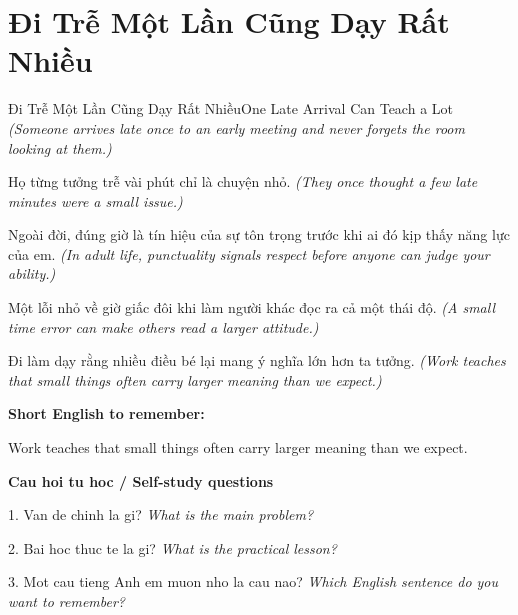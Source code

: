 \section{Đi Trễ Một Lần Cũng Dạy Rất Nhiều}
\begin{truyen}{Đi Trễ Một Lần Cũng Dạy Rất Nhiều}{One Late Arrival Can Teach a Lot}
\textit{(Someone arrives late once to an early meeting and never forgets the room looking at them.)}

Họ từng tưởng trễ vài phút chỉ là chuyện nhỏ.
\textit{(They once thought a few late minutes were a small issue.)}

Ngoài đời, đúng giờ là tín hiệu của sự tôn trọng trước khi ai đó kịp thấy năng lực của em.
\textit{(In adult life, punctuality signals respect before anyone can judge your ability.)}

Một lỗi nhỏ về giờ giấc đôi khi làm người khác đọc ra cả một thái độ.
\textit{(A small time error can make others read a larger attitude.)}

\end{truyen}

\begin{baihoc}
Đi làm dạy rằng nhiều điều bé lại mang ý nghĩa lớn hơn ta tưởng.
\textit{(Work teaches that small things often carry larger meaning than we expect.)}
\end{baihoc}

\begin{ghinhoanh}
\textbf{Short English to remember:}

Work teaches that small things often carry larger meaning than we expect.

\end{ghinhoanh}

\begin{tuhocnhanh}
\textbf{Cau hoi tu hoc / Self-study questions}

1. Van de chinh la gi? \textit{What is the main problem?}

2. Bai hoc thuc te la gi? \textit{What is the practical lesson?}

3. Mot cau tieng Anh em muon nho la cau nao? \textit{Which English sentence do you want to remember?}
\end{tuhocnhanh}
\ngancach

